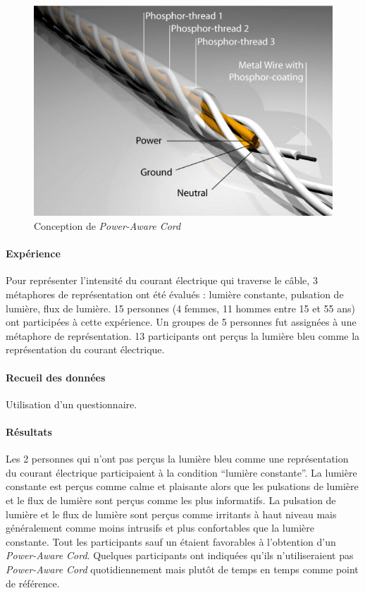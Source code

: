 \documentclass[10pt,a5paper,twoside]{article}
\begin{document}
\begin{figure}
\centering
\includegraphics[]{images/powerawarecord-screenshot2.png}
\caption{Conception de \emph{Power-Aware
Cord}}\label{fig:powerawarecord2}
\end{figure}

\paragraph{Expérience}\label{expuxe9rience-1}

Pour représenter l'intensité du courant électrique qui traverse le
câble, 3 métaphores de représentation ont été évalués : lumière
constante, pulsation de lumière, flux de lumière. 15 personnes (4
femmes, 11 hommes entre 15 et 55 ans) ont participées à cette
expérience. Un groupes de 5 personnes fut assignées à une métaphore de
représentation. 13 participants ont perçus la lumière bleu comme la
représentation du courant électrique.

\paragraph{Recueil des données}\label{recueil-des-donnuxe9es-6}

Utilisation d'un questionnaire.

\paragraph{Résultats}\label{ruxe9sultats-1}

Les 2 personnes qui n'ont pas perçus la lumière bleu comme une
représentation du courant électrique participaient à la condition
``lumière constante''. La lumière constante est perçus comme calme et
plaisante alors que les pulsations de lumière et le flux de lumière sont
perçus comme les plus informatifs. La pulsation de lumière et le flux de
lumière sont perçus comme irritants à haut niveau mais généralement
comme moins intrusifs et plus confortables que la lumière constante.
Tout les participants sauf un étaient favorables à l'obtention d'un
\emph{Power-Aware Cord}. Quelques participants ont indiquées qu'ils
n'utiliseraient pas \emph{Power-Aware Cord} quotidiennement mais plutôt
de temps en temps comme point de référence.
\end{document}
